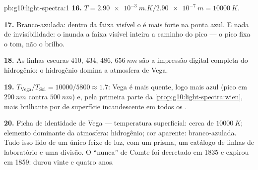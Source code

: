 \begin{solution}{pb:g10:light-spectra:1}
\textbf{16.} $T = \qty{2.90e-3}{m.K} / \qty{2.90e-7}{m}
= \qty{10000}{K}$.

\textbf{17.} Branco-azulada: dentro da faixa visível o  é mais forte
na ponta azul. E nada de invisibilidade: o  inunda a faixa
visível inteira a caminho do pico  --- o pico fixa o tom, não o
brilho.

\textbf{18.} As linhas escuras $410$, $434$, $486$, $\qty{656}{nm}$ são a
impressão digital completa do hidrogênio: o hidrogênio domina a atmosfera de
Vega.

\textbf{19.} $T_{\text{Vega}} / T_{\text{Sol}} = 10000 / 5800 \approx 1.7$:
Vega é mais quente, logo mais azul (pico em $\qty{290}{nm}$ contra
$\qty{500}{nm}$) e, pela primeira parte da
\cref{prop:g10:light-spectra:wien}, mais brilhante por  de superfície
incandescente em todos os .

\textbf{20.} Ficha de identidade de Vega --- temperatura superficial: cerca
de $\qty{10000}{K}$; elemento dominante da atmosfera: hidrogênio; cor
aparente: branco-azulada. Tudo isso lido de um único feixe de luz, com um
prisma, um catálogo de linhas de laboratório e uma divisão. O ``nunca'' de
Comte foi decretado em 1835 e expirou em 1859: durou vinte e quatro anos.
\end{solution}
